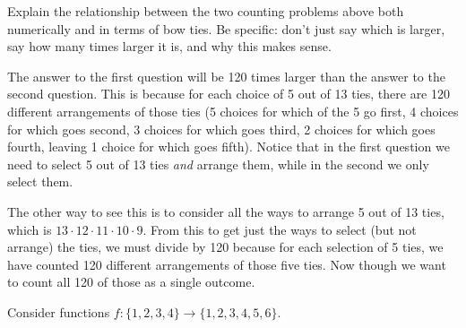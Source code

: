 \documentclass[11pt]{exam}
\begin{document}
\begin{questions}
\question[12] Explain the relationship between the two counting problems above both numerically and in terms of bow ties.  Be specific: don't just say which is larger, say how many times larger it is, and why this makes sense.

\begin{solution}
The answer to the first question will be 120 times larger than the answer to the second question.  This is because for each choice of 5 out of 13 ties, there are 120 different arrangements of those ties (5 choices for which of the 5 go first, 4 choices for which goes second, 3 choices for which goes third, 2 choices for which goes fourth,  leaving 1 choice for which goes fifth).  Notice that in the first question we need to select 5 out of 13 ties {\em and} arrange them, while in the second we only select them.

The other way to see this is to consider all the ways to arrange 5 out of 13 ties, which is $13\cdot 12\cdot 11 \cdot 10 \cdot 9$.  From this to get just the ways to select (but not arrange) the ties, we must divide by 120 because for each selection of 5 ties, we have counted 120 different arrangements of those five ties.  Now though we want to count all 120  of those as a single outcome.
\end{solution}

\vfill


\newpage

\question Consider functions $f: \{1,2,3,4\} \to \{1,2,3,4,5,6\}$.
\end{questions}
\end{document}
